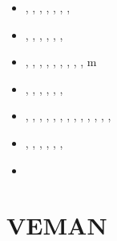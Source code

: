 \begin{small}
\begin{itemize}
                             \textcite{smbc19},  \textcite{canc19b}
\item[\twothousandtwenty]      \textcite{magm20},  \textcite{sams20},  \textcite{capi20}, 
                               \textcite{ghbm20},  \textcite{canc20},  \textcite{cofm20},
                               \textcite{gumc20},  \textcite{sche20}
\item[\twothousandtwentyone]   \textcite{kotr21},  \textcite{qizx21},
                               \textcite{stsc21},  \textcite{zhzl21}, \textcite{scst21},
                               \textcite{xiwk21},  \textcite{kncw21}
\item[\twothousandtwentytwo]   \textcite{wakw22},  \textcite{alrr22b}, \textcite{pefv22},
                               \textcite{olgr22},  \textcite{bahf22},  \textcite{canm22},
                               \textcite{wacw22},  \textcite{baha22},  \textcite{zugc22},
                               \textcite{aryt22}m  \textcite{sayl22}
\item[\twothousandtwentythree] \textcite{lass23}, \textcite{giln23}, \textcite{yaat23},
                               \textcite{scsb23}, \textcite{mord23}, \textcite{ligu23a},
                               \textcite{ligu23b}
\item[\twothousandtwentyfour]  \textcite{deyz24}, \textcite{gucm24}, \textcite{yuga24},
                               \textcite{comi24}, \textcite{waxu24}, \textcite{caks24},
                               \textcite{shmo24}, \textcite{licc24}, \textcite{lihl24},
                               \textcite{chrm24}, \textcite{malb24}, \textcite{fagl24},
                               \textcite{rogm24}, \textcite{zhsf24}
\item[\twothousandtwentyfive]  \textcite{walc25}, \textcite{gigl25}, \textcite{gorr25},
                               \textcite{fagm25}, \textcite{momg25}, \textcite{cagm25b},
                               \textcite{kncw25}
\item[2026]                    \textcite{wawl26}
\end{itemize}
\end{small}



\section{VEMAN}

